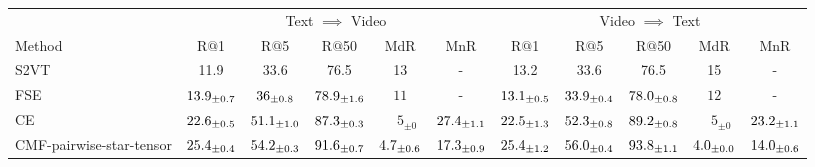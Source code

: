 \begin{table*}[h!]
\centering 
\footnotesize 
\setlength{\tabcolsep}{2pt}
\begin{tabular}{l | c c c c c | c c c c c} 
\hline \hline
\multicolumn{1}{c}{} & 
\multicolumn{5}{c}{Text $\implies$ Video} & \multicolumn{5}{c}{Video $\implies$ Text} \\
Method & R$@$1 & R$@$5 & R$@$50 & MdR & MnR & R$@$1 & R$@$5 & R$@$50 & MdR & MnR \\ 
\hline 
S2VT  & 11.9 & 33.6 & 76.5 & 13 & - & 13.2 & 33.6 & 76.5 & 15 & - \\
FSE & $ 13.9_{\pm0.7}$ & $ 36_{\pm0.8}$ & $ {78.9}_{\pm 1.6}$ & $11$ & - & $ {13.1}_{\pm0.5}$ & $ {33.9}_{\pm0.4}$ & $ 78.0_{\pm0.8}$ & $12$ &  - \\
CE & $ 22.6_{\pm0.5}$ & $ 51.1_{\pm1.0}$ & $ 87.3_{\pm0.3}$ & $\hspace{1em} 5_{\pm0}$ & $ 27.4_{\pm1.1}$ & $ 22.5_{\pm1.3}$ & $ 52.3_{\pm0.8}$ & $ 89.2_{\pm0.8}$ & $\hspace{1em} 5_{\pm0}$ & $ 23.2_{\pm1.1}$ \\
\hline
CMF-pairwise-star-tensor & $ 25.4_{\pm0.4}$ & $ 54.2_{\pm0.3}$ & $ 91.6_{\pm0.7}$ & $ 4.7_{\pm0.6}$ & $ 17.3_{\pm0.9}$ & $ 25.4_{\pm1.2}$ & $ 56.0_{\pm0.4}$ & $ 93.8_{\pm1.1}$ & $ 4.0_{\pm0.0}$ & $ 14.0_{\pm0.6}$ \\


\end{tabular}
\end{table*}
